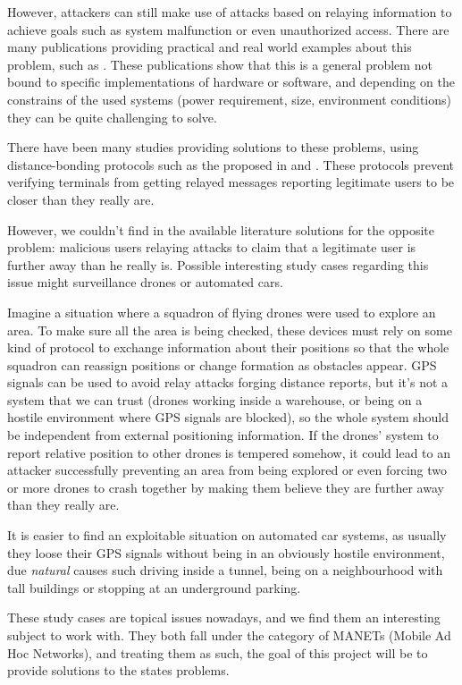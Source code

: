 \documentclass{article}
\begin{document}
However, attackers can still make use of attacks based on relaying information to achieve goals such as system malfunction or even unauthorized access. There are many publications providing practical and real world examples about this problem, such as \cite{francillon2011relay, hancke2005practical, hu2006wormhole}. These publications show that this is a general problem not bound to specific implementations of hardware or software, and depending on the constrains of the used systems (power requirement, size, environment conditions) they can be quite challenging to solve.

There have been many studies providing solutions to these problems, using distance-bonding protocols such as the proposed in \cite{brands1994distance} and \cite{rasmussen2010realization}. These protocols prevent verifying terminals from getting relayed messages reporting legitimate users to be closer than they really are.

However, we couldn't find in the available literature solutions for the opposite problem: malicious users relaying attacks to claim that a legitimate user is further away than he really is. Possible interesting study cases regarding this issue might surveillance drones or automated cars.

Imagine a situation where a squadron of flying drones were used to explore an area. To make sure all the area is being checked, these devices must rely on some kind of protocol to exchange information about their positions so that the whole squadron can reassign positions or change formation as obstacles appear. GPS signals can be used to avoid relay attacks forging distance reports, but it's not a system that we can trust (drones working inside a warehouse, or being on a hostile environment where GPS signals are blocked), so the whole system should be independent from external positioning information. If the drones' system to report relative position to other drones is tempered somehow, it could lead to an attacker successfully preventing an area from being explored or even forcing two or more drones to crash together by making them believe they are further away than they really are.

It is easier to find an exploitable situation on automated car systems, as usually they loose their GPS signals without being in an obviously hostile environment, due \emph{natural} causes such driving inside a tunnel, being on a neighbourhood with tall buildings or stopping at an underground parking.

These study cases are topical issues nowadays, and we find them an interesting subject to work with. They both fall under the category of MANETs (Mobile Ad Hoc Networks), and treating them as such, the goal of this project will be to provide solutions to the states problems.
\end{document}
